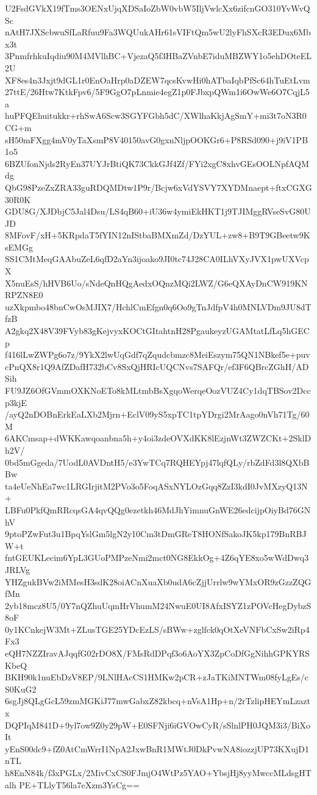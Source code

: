 U2FsdGVkX19fTms3OENxUjqXDSaIoZbW0vbW5IljVwlcXx6zifcnGO310YvWvQSc
nAtH7JXScbwuSfLaRfuu9Fa3WQUukAHr61sVIFtQm5wU2lyFhSXcR3EDux6Mbx3t
3PnmfrhkuIqdiu90M4MVlhBC+VjezaQ5f3HBaZVnbE7iduMBZWY1o5ehDOteEL2U
XF8es4n3Jxjt9dGL1r0EnOaHrp0aDZEW7qcsKvwHi0hATbaIqbPfSc64hTuEtLvm
27ttE/26Htw7KtkFpv6/5F9GgO7pLnmie4egZ1p0FJbxpQWm1i6OwWe6O7CqjL5a
huPFQEhuitukkr+rhSwA6Scw3SGYFGbh5dC/XWlhaKkjAgSmY+mi3t7oN3R0CG+m
sH50mFXgg4mV0yTaXsmP8V40150avG0gxnNljpOOKGr6+P8RSd090+j9iV1PB1o5
6BZUfonNjds2RyEn37UYJrBtiQK73CkkGJf4Zf/FYi2xgC8xhvGEsOOLNpfAQMdg
QbG98PzeZxZRA33guRDQMDtw1P9r/Bcjw6xVdYSVY7XYDMnaept+ftxCGXG30R0K
GDU8G/XJDbjC5Jal4Dsu/LS4qB60+iU36w4ymiEkHKT1j9TJIMggRVseSvG80UJD
8MFovF/xH+5KRpdaT5fYIN12nIStbaBMXmZd/DzYUL+zw8+B9T9GBeetw9KsEMGg
SS1CMtMeqGAAbuZeL6qfD2aYn3ijoako9JI0tc74J28CA0ILhVXyJVX1pwUXVcpX
X5nuEsS/hHVB6Uo/sNdeQnHQgAedxOQnzMQi2LWZ/G6eQXAyDnCW919KNRPZN8E0
uzXkpmbo48bnCwOsMJIX7/HchlCmEfgn0q6Oo9gTnJdfpV4h0MNLVDm9JU8dTfzB
A2gkq2X48V39FVyb83gKejvyxKOCtGItahtnH28PgaukeyzUGAMtatLfLq5hGECp
f416lLwZWPg6o7z/9YkX2lwUqGdf7qZqudcbmzc8MeiEszym75QN1NBkef5e+puv
cPnQX8r1Q9AfZDafH732bCv8SxQjHRIcUQCNvs7SAFQr/ef3F6QBrcZGhH/ADSih
FU9JZ6OfGVmmOXKNoETo8kMLtmbBsXgqoWerqeOozVUZ4Cy1dqTBSov2Dccp3kjE
/ayQ2nDOBnErkEaLXb2Mjrn+EclV09yS5xpTC1tpYDrgi2MrAago0nVh71Tg/60M
6AKCmsap+dWKKawqoanbna5h+y4oi3zdeOVXdKK8lEzjnWt3ZWZCKt+2SklDh2V/
0bd5mGgeda/7UodL0AVDntH5/e3YwTCq7RQHEYpj47lqfQLy/rbZdFd3l8QXbBBw
ta4eUeNhEa7wc1LRGIrjitM2PVo3o5FoqASxNYLOzGqq8ZzI3kdI0JvMXzyQ13N+
LBFu0PkfQmRRcqsGA4qvQQg0ezetkh46MdJhYimnuGnWE26edcijpOiyBd76GNhV
9ptoPZwFut3u1BpqYslGm5lgN2y10Cm3tDmGReT8HONfSakoJK5kp179BnRBJW+t
fntGEUKLecim6YpL3GUoPMPzeNmi2mct0NG8EkkOg+4Z6qYE8xo5wWdDwq3JRLVg
YHZgukBVw2iMMesH3sdK28oiACnXuaXb0udA6cZjjUrrlw9wYMxOR9zGzzZQGfMn
2yb18mcz8U5/0Y7nQZhuUqmHrVhumM24NwuE0UI8AfxISYZ1zPOVcHegDybzS8oF
0y1KCnkejW3Mt+ZLusTGE25YDcEzLS/sBWw+zglfck0qOtXeVNFbCxSw2iRp4Fx3
eQH7NZZIravAJqqfG02rDO8X/FMsRdDPqf3o6AoYX3ZpCoDfGgNihhGPKYRSKbeQ
BKH90k1nuEbDzV8EP/9LNlHAcCS1HMKw2pCR+zJaTKiMNTWm08fyLgEs/cS0KuG2
6sgJj8QLgGcL59zmMGKiJ77mwGabxZ82kbcq+nVsA1Hp+n/2rTzlipHEYmLzaztx
DQPIqM841D+9yl7ow9Z0y29pW+E0SFNji6iGVOwCyR/sSlnlPH0JQM3i3/BiXoIt
yEnS00dc9+fZ0AtCmWrrI1NpA2JxwBnR1MWtJ0DkPvwNA8iozzjUP73KXujD1nTL
h8EnN84k/f3xPGLx/2MivCxCS0FJmjO4WtPz5YAO+YbsjHj8yyMwccMLdsgHTalh
PE+TLlyT56la7eXzm3YsCg==
